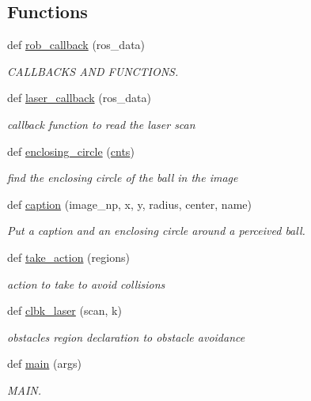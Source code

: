 \subsection*{Functions}
\begin{DoxyCompactItemize}
\item 
def \hyperlink{namespacePerception_ae23dae157a1ef4e00fb8d4d11ed4cfd7}{rob\+\_\+callback} (ros\+\_\+data)
\begin{DoxyCompactList}\small\item\em C\+A\+L\+L\+B\+A\+C\+KS A\+ND F\+U\+N\+C\+T\+I\+O\+NS. \end{DoxyCompactList}\item 
def \hyperlink{namespacePerception_a34e5d1ea23bca609f6613f955a102c8f}{laser\+\_\+callback} (ros\+\_\+data)
\begin{DoxyCompactList}\small\item\em callback function to read the laser scan \end{DoxyCompactList}\item 
def \hyperlink{namespacePerception_a235ca282efe20cd6f6553cf69dfa3416}{enclosing\+\_\+circle} (\hyperlink{namespacePerception_ae9b407646d9596cc4c837cadcc084168}{cnts})
\begin{DoxyCompactList}\small\item\em find the enclosing circle of the ball in the image \end{DoxyCompactList}\item 
def \hyperlink{namespacePerception_aad4a17a04d9de153f903bec742d3f1c4}{caption} (image\+\_\+np, x, y, radius, center, name)
\begin{DoxyCompactList}\small\item\em Put a caption and an enclosing circle around a perceived ball. \end{DoxyCompactList}\item 
def \hyperlink{namespacePerception_a2fca011fd161b10ca2292edbb9897af5}{take\+\_\+action} (regions)
\begin{DoxyCompactList}\small\item\em action to take to avoid collisions \end{DoxyCompactList}\item 
def \hyperlink{namespacePerception_a9210db14d4f3a53190632b2097f7444c}{clbk\+\_\+laser} (scan, k)
\begin{DoxyCompactList}\small\item\em obstacles region declaration to obstacle avoidance \end{DoxyCompactList}\item 
def \hyperlink{namespacePerception_a4fe5d026a2ef743aa57777be689aeb43}{main} (args)
\begin{DoxyCompactList}\small\item\em M\+A\+IN. \end{DoxyCompactList}\end{DoxyCompactItemize}
